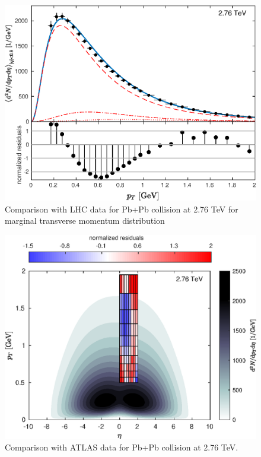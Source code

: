 \documentclass[a4paper,12pt]{book}
\begin{document}
\begin{figure}
	\begin{center}
		\centering
		\includegraphics[width=\linewidth]{images/Pb_276_plot_pT.eps}
		\caption{Comparison with LHC data for Pb+Pb collision at 2.76 TeV for marginal transverse momentum distribution}
		\label{fig:Pb_276_pT}
	\end{center}
\end{figure}

\begin{figure}
	\begin{center}
		\centering
		\includegraphics[width=\linewidth]{images/Pb_276_plot_2d.eps}
		\caption{Comparison with ATLAS data for Pb+Pb collision at 2.76 TeV.}
		\label{fig:Pb_276_2d}
	\end{center}
\end{figure}
\end{document}
